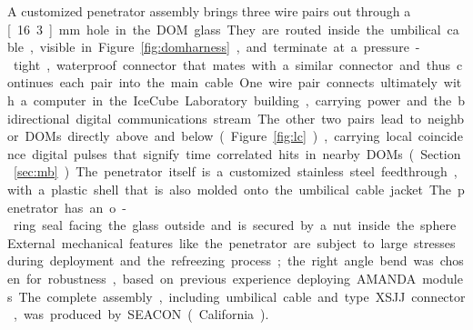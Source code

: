
A customized penetrator assembly brings three wire pairs out through a \unit[16.3]mm hole in
the DOM glass.  They are routed inside the umbilical cable, visible in Figure~\ref{fig:domharness},
and terminate at a pressure-tight, waterproof connector that mates with a similar connector
and thus continues each pair into the main cable.  One wire pair connects ultimately with a 
computer in the IceCube Laboratory building, carrying power and the bidirectional digital
communications stream.  
The other two pairs lead to neighbor DOMs directly above and below (Figure~\ref{fig:lc}),
carrying local coincidence digital pulses that signify time correlated hits in nearby DOMs (Section~\ref{sec:mb}).

The penetrator itself is a customized stainless steel feedthrough, with a plastic shell that is also molded onto
the umbilical cable jacket.  
The penetrator has an o-ring seal facing the glass outside and is secured by a nut inside the sphere.  
External mechanical features like the penetrator are subject to large stresses during deployment and the refreezing process;
the right angle bend was chosen for robustness, based on previous experience deploying AMANDA modules.
The complete assembly, including umbilical cable and type XSJJ connector, was produced by SEACON (California).  


